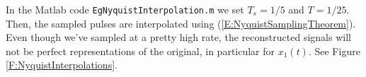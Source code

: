 In the Matlab code \texttt{EgNyquistInterpolation.m}  we set
$T_s=1/5$ and $T=1/25$.  Then, the sampled pulses are
interpolated using (\ref{E:NyquistSamplingTheorem}). Even though
we've sampled at a pretty high rate, the reconstructed signals will
not be perfect representations of the original, in particular for
$x_1(t)$.  See Figure \ref{F:NyquistInterpolations}.


% 
% 
% 
% 
% 
% 
